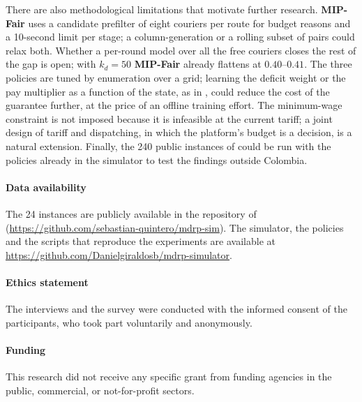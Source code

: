 \documentclass[a4paper,11pt,review,3p,authoryear]{elsarticle}
\begin{document}
There are also methodological limitations that motivate further research. \textbf{MIP-Fair} uses a candidate prefilter of eight couriers per route for budget reasons and a 10-second limit per stage; a column-generation or a rolling subset of pairs could relax both. Whether a per-round model over all the free couriers closes the rest of the gap is open; with $k_d = 50$ \textbf{MIP-Fair} already flattens at $0.40$--$0.41$. The three policies are tuned by enumeration over a grid; learning the deficit weight or the pay multiplier as a function of the state, as in \cite{stein2024learning}, could reduce the cost of the guarantee further, at the price of an offline training effort. The minimum-wage constraint is not imposed because it is infeasible at the current tariff; a joint design of tariff and dispatching, in which the platform's budget is a decision, is a natural extension. Finally, the 240 public instances of \cite{reyes2018meal} could be run with the policies already in the simulator to test the findings outside Colombia.

\paragraph{Data availability} {\sloppy The 24 instances are publicly available in the repository of \citet{quintero2020computational} (\url{https://github.com/sebastian-quintero/mdrp-sim}). The simulator, the policies and the scripts that reproduce the experiments are available at \url{https://github.com/Danielgiraldosb/mdrp-simulator}.\par}

\paragraph{Ethics statement} The interviews and the survey were conducted with the informed consent of the participants, who took part voluntarily and anonymously.

\paragraph{Funding} This research did not receive any specific grant from funding agencies in the public, commercial, or not-for-profit sectors.



\end{document}
